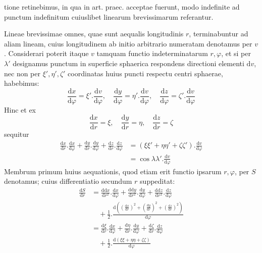 %
tione retinebimus, in qua in art. praec. acceptae fuerunt, modo indefinite ad punctum indefinitum cuiuslibet linearum brevissimarum referantur.

Lineae brevissimae omnes, quae sunt aequalis longitudinis \(r\), terminabuntur ad aliam lineam, cuius longitudinem ab initio arbitrario numeratam denotamus per \(v\). Considerari poterit itaque \(v\) tamquam functio indeterminatarum \(r,\varphi\), et si per \(\lambda'\) designamus punctum in superficie sphaerica respondens directioni elementi \(\mathrm{d}v\), nec non per \(\xi',\eta',\zeta'\) coordinatas huius puncti respectu centri sphaerae, habebimus:
\[
\frac{\mathrm{d}x}{\mathrm{d}\varphi}=\xi'\mathord{.}\frac{\mathrm{d}v}{\mathrm{d}\varphi},\quad
\frac{\mathrm{d}y}{\mathrm{d}\varphi}=\eta'\mathord{.}\frac{\mathrm{d}v}{\mathrm{d}\varphi},\quad
\frac{\mathrm{d}z}{\mathrm{d}\varphi}=\zeta'\mathord{.}\frac{\mathrm{d}v}{\mathrm{d}\varphi}
\]
Hinc et ex
\[
\frac{\mathrm{d}x}{\mathrm{d}r}=\xi,\quad\frac{\mathrm{d}y}{\mathrm{d}r}=\eta,\quad\frac{\mathrm{d}z}{\mathrm{d}r}=\zeta
\]
sequitur
\[
\begin{aligned}
\frac{\mathrm{d}x}{\mathrm{d}r}\mathord{.}\frac{\mathrm{d}x}{\mathrm{d}\varphi}+\frac{\mathrm{d}y}{\mathrm{d}r}\mathord{.}\frac{\mathrm{d}y}{\mathrm{d}\varphi}+\frac{\mathrm{d}z}{\mathrm{d}r}\mathord{.}\frac{\mathrm{d}z}{\mathrm{d}\varphi}
&=(\xi\xi'+\eta\eta'+\zeta\zeta')\mathord{.}\frac{\mathrm{d}v}{\mathrm{d}\varphi}\\
&=\cos\lambda\lambda'\mathord{.}\frac{\mathrm{d}v}{\mathrm{d}\varphi}
\end{aligned}
\]
Membrum primum huius aequationis, quod etiam erit functio ipsarum \(r,\varphi\), per \(S\) denotamus; cuius differentiatio secundum \(r\) suppeditat:
\[
\begin{aligned}
\frac{\mathrm{d}S}{\mathrm{d}r}&=\frac{\mathrm{d}\mathrm{d}x}{\mathrm{d}r^2}\mathord{.}\frac{\mathrm{d}x}{\mathrm{d}\varphi}+\frac{\mathrm{d}\mathrm{d}y}{\mathrm{d}r^2}\mathord{.}\frac{\mathrm{d}y}{\mathrm{d}\varphi}+\frac{\mathrm{d}\mathrm{d}z}{\mathrm{d}r^2}\mathord{.}\frac{\mathrm{d}z}{\mathrm{d}\varphi}\\
&\quad+\tfrac{1}{2}\mathord{.}\frac{\mathrm{d}((\tfrac{\mathrm{d}x}{\mathrm{d}r})^2+(\tfrac{\mathrm{d}y}{\mathrm{d}r})^2+(\tfrac{\mathrm{d}z}{\mathrm{d}r})^2)}{\mathrm{d}\varphi}\\
&=\frac{\mathrm{d}\xi}{\mathrm{d}r}\mathord{.}\frac{\mathrm{d}x}{\mathrm{d}\varphi}+\frac{\mathrm{d}\eta}{\mathrm{d}r}\mathord{.}\frac{\mathrm{d}y}{\mathrm{d}\varphi}+\frac{\mathrm{d}\zeta}{\mathrm{d}r}\mathord{.}\frac{\mathrm{d}z}{\mathrm{d}\varphi}\\
&\quad+\tfrac{1}{2}\mathord{.}\frac{\mathrm{d}(\xi\xi+\eta\eta+\zeta\zeta)}{\mathrm{d}\varphi}
\end{aligned}
\]
